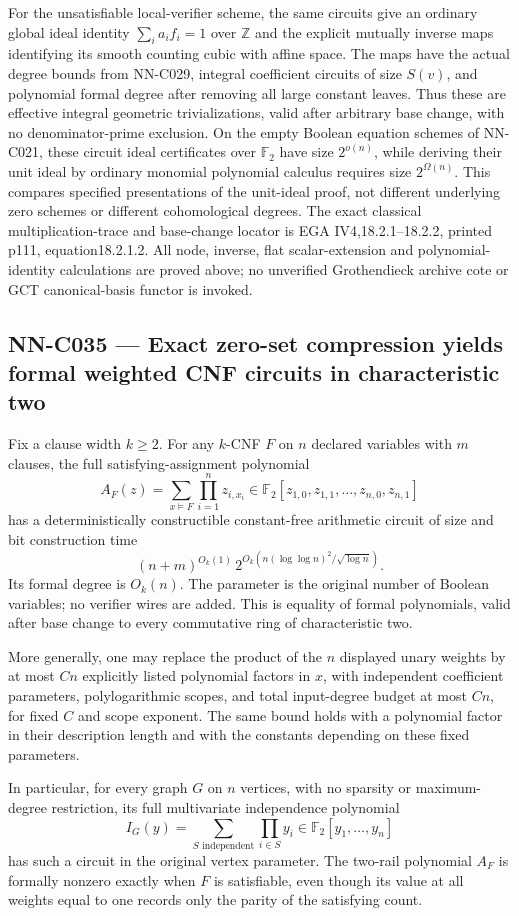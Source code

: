 For the unsatisfiable local-verifier scheme, the same circuits give an ordinary global ideal identity $\sum_i a_if_i=1$ over $\mathbb Z$ and the explicit mutually inverse maps identifying its smooth counting cubic with affine space. The maps have the actual degree bounds from NN-C029, integral coefficient circuits of size $S(v)$, and polynomial formal degree after removing all large constant leaves. Thus these are effective integral geometric trivializations, valid after arbitrary base change, with no denominator-prime exclusion. On the empty Boolean equation schemes of NN-C021, these circuit ideal certificates over $\mathbb F_2$ have size $2^{o(n)}$, while deriving their unit ideal by ordinary monomial polynomial calculus requires size $2^{\Omega(n)}$. This compares specified presentations of the unit-ideal proof, not different underlying zero schemes or different cohomological degrees. The exact classical multiplication-trace and base-change locator is EGA IV4,18.2.1--18.2.2, printed p111, equation18.2.1.2. All node, inverse, flat scalar-extension and polynomial-identity calculations are proved above; no unverified Grothendieck archive cote or GCT canonical-basis functor is invoked.

\subsection{NN-C035 --- Exact zero-set compression yields formal weighted CNF circuits in characteristic two}
\begin{proposition}[NN-C035]
Fix a clause width $k\ge2$. For any $k$-CNF $F$ on $n$ declared variables with $m$ clauses, the full satisfying-assignment polynomial
\[
 A_F(z)=\sum_{x\models F}\prod_{i=1}^n z_{i,x_i}
                       \in\mathbb F_2[z_{1,0},z_{1,1},\ldots,z_{n,0},z_{n,1}]
\]
has a deterministically constructible constant-free arithmetic circuit of size and bit construction time
\[
 (n+m)^{O_k(1)}\,
      2^{O_k(n(\log\log n)^2/\sqrt{\log n})}.
\]
Its formal degree is $O_k(n)$. The parameter is the original number of Boolean variables; no verifier wires are added. This is equality of formal polynomials, valid after base change to every commutative ring of characteristic two.

More generally, one may replace the product of the $n$ displayed unary weights by at most $Cn$ explicitly listed polynomial factors in $x$, with independent coefficient parameters, polylogarithmic scopes, and total input-degree budget at most $Cn$, for fixed $C$ and scope exponent. The same bound holds with a polynomial factor in their description length and with the constants depending on these fixed parameters.

In particular, for every graph $G$ on $n$ vertices, with no sparsity or maximum-degree restriction, its full multivariate independence polynomial
\[
                       I_G(y)=\sum_{S\text{ independent}}\prod_{i\in S}y_i
                                      \in\mathbb F_2[y_1,\ldots,y_n]
\]
has such a circuit in the original vertex parameter. The two-rail polynomial $A_F$ is formally nonzero exactly when $F$ is satisfiable, even though its value at all weights equal to one records only the parity of the satisfying count.
\end{proposition}
